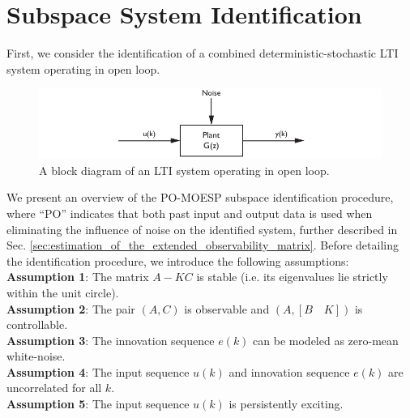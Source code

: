\section{Subspace System Identification}
First, we consider the identification of a combined deterministic-stochastic LTI system operating in open loop.
\begin{figure}[htb!]
	\centering
	\includegraphics{../fig/open_loop_block_diagram.pdf}
	\caption{A block diagram of an LTI system operating in open loop.}
\end{figure}
We present an overview of the PO-MOESP subspace identification procedure, where ``PO'' indicates that both past input and output data is used when eliminating the influence of noise on the identified system, further described in Sec. \ref{sec:estimation_of_the_extended_observability_matrix}. Before detailing the identification procedure, we introduce the following assumptions:\\
\textbf{Assumption 1}: The matrix $A - KC$ is stable (i.e. its eigenvalues lie strictly within the unit circle).\\
\textbf{Assumption 2}: The pair $(A,C)$ is observable and $(A, [B \quad K])$ is controllable.\\
\textbf{Assumption 3}: The innovation sequence $e(k)$ can be modeled as zero-mean white-noise.\\
\textbf{Assumption 4}: The input sequence $u(k)$ and innovation sequence $e(k)$ are uncorrelated for all $k$.\\
\textbf{Assumption 5}: The input sequence $u(k)$ is persistently exciting.

